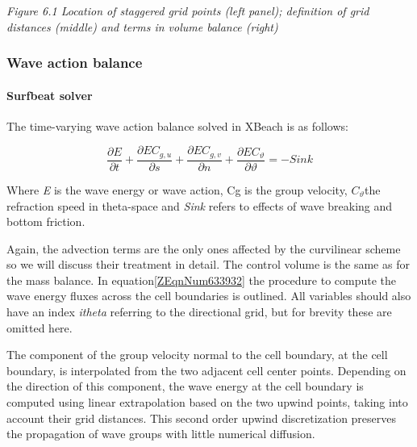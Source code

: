 \documentclass{article}
\begin{document}
\noindent \textit{Figure 6.1 Location of staggered grid points (left panel); definition of grid distances (middle) and terms in volume balance (right)}

\noindent \textbf{\textit{}}


\subsubsection{ Wave action balance}


\paragraph{ Surfbeat solver}

\noindent The time-varying wave action balance solved in XBeach is as follows:

\noindent 
\begin{equation} \label{6.1)} 
\frac{\partial E}{\partial t} +\frac{\partial EC_{g,u} }{\partial s} +\frac{\partial EC_{g,v} }{\partial n} +\frac{\partial EC_{\vartheta } }{\partial \vartheta } =-Sink 
\end{equation} 


\noindent Where \textit{E} is the wave energy or wave action, Cg is the group velocity, $C_{\vartheta } $the refraction speed in theta-space and \textit{Sink} refers to effects of wave breaking and bottom friction.

\noindent Again, the advection terms are the only ones affected by the curvilinear scheme so we will discuss their treatment in detail. The control volume is the same as for the mass balance. In equation\eqref{ZEqnNum633932} the procedure to compute the wave energy fluxes across the cell boundaries is outlined. All variables should also have an index \textit{itheta} referring to the directional grid, but for brevity these are omitted here. 

\noindent 

\noindent The component of the group velocity normal to the cell boundary, at the cell boundary, is interpolated from the two adjacent cell center points. Depending on the direction of this component, the wave energy at the cell boundary is computed using linear extrapolation based on the two upwind points, taking into account their grid distances. This second order upwind discretization preserves the propagation of wave groups with little numerical diffusion.
\end{document}
